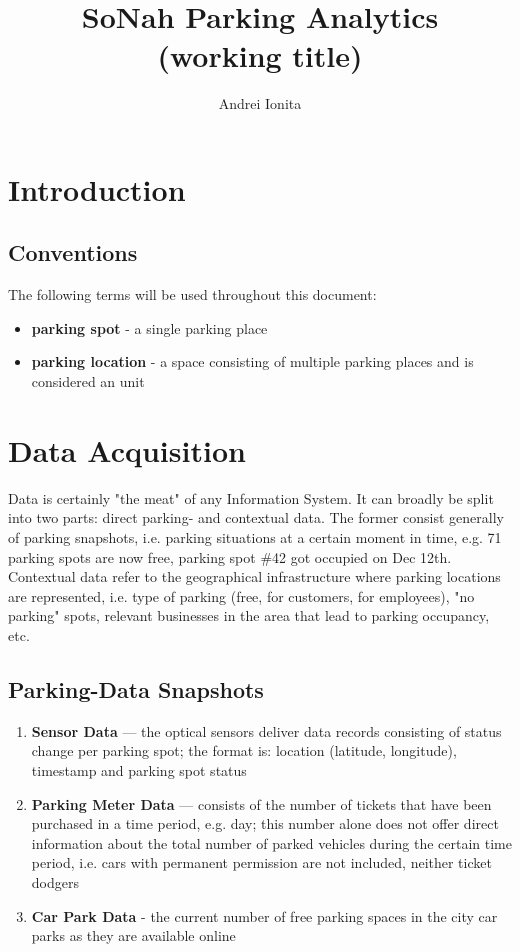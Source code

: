\documentclass{article}
\begin{document}
\title{SoNah Parking Analytics \\ \large (working title)}
\author{Andrei Ionita}

\maketitle

\section{Introduction}
\subsection{Conventions}
The following terms will be used throughout this document:
\begin{itemize}
\item \textbf{parking spot} - a single parking place
\item \textbf{parking location} - a space consisting of multiple parking places and is considered an unit
\end{itemize}

\section{Data Acquisition}
Data is certainly "the meat" of any Information System. It can broadly be split into two parts: direct parking- and contextual data. The former consist generally of parking snapshots, i.e. parking situations at a certain moment in time, e.g. 71 parking spots are now free, parking spot \#42 got occupied on Dec 12th. Contextual data refer to the geographical infrastructure where parking locations are represented, i.e. type of parking (free, for customers, for employees), "no parking" spots, relevant businesses in the area that lead to parking occupancy, etc.

\subsection{Parking-Data Snapshots}
\begin{enumerate}
\item \textbf{Sensor Data} --- the optical sensors deliver data records consisting of status change per parking spot; the format is: location (latitude, longitude), timestamp and parking spot status
\item \textbf{Parking Meter Data} --- consists of the number of tickets that have been purchased in a time period, e.g. day; this number alone does not offer direct information about the total number of parked vehicles during the certain time period, i.e. cars with permanent permission are not included, neither ticket dodgers
\item \textbf{Car Park Data} - the current number of free parking spaces in the city car parks as they are available online
\end{enumerate}
\end{document}
